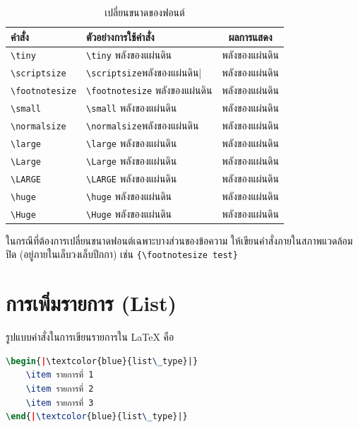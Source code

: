 \begin{table}[H]
    \centering
    \footnotesize
    \begin{threeparttable}
        \caption{เปลี่ยนขนาดของฟอนต์}
        \label{tab:font size}
        \begin{tabular}{l C{6cm} c}
            \toprule
            \textbf{คำสั่ง} & \textbf{ตัวอย่างการใช้คำสั่ง} & \textbf{ผลการแสดง} \\
            \midrule
            \verb|\tiny| & \verb|\tiny| พลังของแผ่นดิน & \tiny พลังของแผ่นดิน \\
            \verb|\scriptsize| & \verb|\scriptsize|พลังของแผ่นดิน| & \scriptsize พลังของแผ่นดิน \\
            \verb|\footnotesize| & \verb|\footnotesize| พลังของแผ่นดิน & \footnotesize พลังของแผ่นดิน \\
            \verb|\small| & \verb|\small| พลังของแผ่นดิน & \small พลังของแผ่นดิน \\
            \verb|\normalsize| & \verb|\normalsize|พลังของแผ่นดิน & \normalsize พลังของแผ่นดิน \\
            \verb|\large| & \verb|\large| พลังของแผ่นดิน & \large พลังของแผ่นดิน \\
            \verb|\Large| & \verb|\Large| พลังของแผ่นดิน & \Large พลังของแผ่นดิน \\
            \verb|\LARGE| & \verb|\LARGE| พลังของแผ่นดิน & \LARGE พลังของแผ่นดิน \\
            \verb|\huge| & \verb|\huge| พลังของแผ่นดิน & \huge พลังของแผ่นดิน \\
            \verb|\Huge| & \verb|\Huge| พลังของแผ่นดิน & \Huge พลังของแผ่นดิน \\
            \bottomrule
        \end{tabular}
    \end{threeparttable}
\end{table}

ในกรณีที่ต้องการเปลี่ยนขนาดฟอนต์เฉพาะบางส่วนของข้อความ ให้เขียนคำสั่งภายในสภาพแวดล้อมปิด (อยู่ภายในเล็บวงเล็บปีกกา) เช่น \verb|{\footnotesize test}|

\newpage
\section{การเพิ่มรายการ (List)}

รูปแบบคำสั่งในการเขียนรายการใน LaTeX คือ

\begin{lstlisting}[caption={รูปแบบคำสั่งในการเขียนรายการ (list)}, label={list:list format},language=TeX]
\begin{|\textcolor{blue}{list\_type}|}
    \item รายการที่ 1
    \item รายการที่ 2
    \item รายการที่ 3
\end{|\textcolor{blue}{list\_type}|}
\end{lstlisting}

